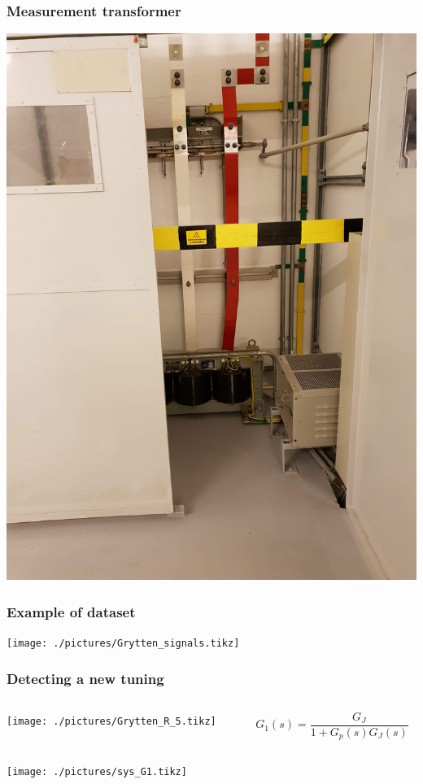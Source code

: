 \begin{frame}
	\frametitle{Measurement transformer}
	\includegraphics[angle=-90, origin=c, height=\textheight]{./pictures/trafo.jpg}
\end{frame}
\begin{frame}
	\frametitle{Example of dataset}
	\texttt{[image: ./pictures/Grytten\_signals.tikz]}
\end{frame}
\begin{frame}
	\frametitle{Detecting a new tuning}
	\begin{columns}
		\begin{column}{0.65\textwidth}
			\texttt{[image: ./pictures/Grytten\_R\_5.tikz]}
		\end{column}
		\begin{column}{0.35\textwidth}
			\begin{equation*}
				G_1(s) = \frac{G_{J}}{1+G_p(s)G_J(s)}
			\end{equation*}
		\end{column}
	\end{columns}
	\texttt{[image: ./pictures/sys\_G1.tikz]}
\end{frame}	

